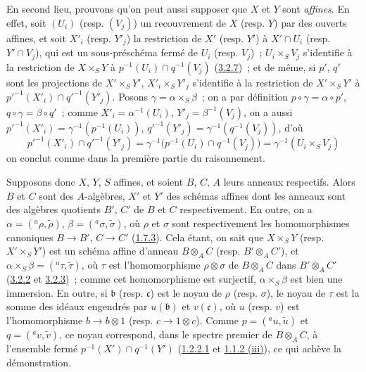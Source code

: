En second lieu, prouvons qu'on peut aussi supposer que $X$ et $Y$ sont
\emph{affines}. En effet, soit $(U_i)$ (resp. $(V_j)$) un recouvrement de $X$
(resp. $Y$) par des ouverts affines, et soit $X'_i$ (resp. $Y'_j$) la
restriction de $X'$ (resp. $Y'$) à $X'\cap U_i$ (resp. $Y'\cap V_j$), qui est
un sous-préschéma fermé de $U_i$ (resp. $V_j$)~; $U_i\times_S V_j$ s'identifie
à la restriction de $X\times_S Y$ à
$p^{-1}(U_i)\cap q^{-1}(V_j)$ (\hyperref[I.3.2.7-fr]{3.2.7})~; et de même, si
$p'$, $q'$ sont les projections de $X'\times_S Y'$,
$X'_i\times_S Y'_j$ s'identifie à la restriction de $X'\times_S Y'$ à
${p'}^{-1}(X'_i)\cap{q'}^{-1}(Y'_j)$. Posons
$\gamma=\alpha\times_S\beta$~; on a par définition
$p\circ\gamma=\alpha\circ p'$, $q\circ\gamma=\beta\circ q'$~; comme
$X'_i=\alpha^{-1}(U_i)$, $Y'_j=\beta^{-1}(V_j)$, on a aussi
${p'}^{-1}(X'_i)=\gamma^{-1}(p^{-1}(U_i))$,
${q'}^{-1}(Y'_j)=\gamma^{-1}(q^{-1}(V_j))$, d'où
\[
  {p'}^{-1}(X'_i)\cap{q'}^{-1}(Y'_j)
  =\gamma^{-1}\bigl(p^{-1}(U_i)\cap q^{-1}(V_j)\bigr)
  =\gamma^{-1}(U_i\times_S V_j)
\]
on conclut comme dans la première partie du raisonnement.

Supposons donc $X$, $Y$, $S$ affines, et soient $B$, $C$, $A$ leurs anneaux
respectifs. Alors $B$ et $C$ sont des $A$-algèbres, $X'$ et $Y'$ des schémas
affines dont les anneaux sont des algèbres quotients $B'$, $C'$ de $B$ et
$C$ respectivement. En outre, on a
$\alpha=({}^a\rho,\widetilde{\rho})$, $\beta=({}^a\sigma,\widetilde{\sigma})$,
où $\rho$ et $\sigma$ sont respectivement les homomorphismes canoniques
$B\to B'$, $C\to C'$ (\hyperref[I.1.7.3-fr]{1.7.3}). Cela étant, on sait que
$X\times_S Y$ (resp. $X'\times_S Y'$) est un schéma affine d'anneau
$B\otimes_A C$ (resp. $B'\otimes_A C'$), et
$\alpha\times_S\beta=({}^a\tau,\widetilde{\tau})$, où $\tau$ est
l'homomorphisme $\rho\otimes\sigma$ de $B\otimes_A C$ dans
$B'\otimes_A C'$ (\hyperref[I.3.2.2-fr]{3.2.2} et
\hyperref[I.3.2.3-fr]{3.2.3})~; comme cet homomorphisme est surjectif,
$\alpha\times_S\beta$ est bien une immersion. En outre, si $\mathfrak{b}$
(resp. $\mathfrak{c}$) est le noyau de $\rho$ (resp. $\sigma$), le noyau de
$\tau$ est la somme des idéaux engendrés par $u(\mathfrak{b})$ et $v(\mathfrak{c})$, où $u$ (resp. $v$) est
l'homomorphisme $b\to b\otimes1$ (resp. $c\to1\otimes c$). Comme
$p=({}^a u,\widetilde{u})$ et $q=({}^a v,\widetilde{v})$, ce noyau correspond,
dans le spectre premier de $B\otimes_A C$, à l'ensemble fermé
$p^{-1}(X')\cap q^{-1}(Y')$ (\hyperref[I.1.2.2.1-fr]{1.2.2.1} et
\hyperref[I.1.1.2-fr]{1.1.2 (iii)}), ce qui achève la démonstration.

